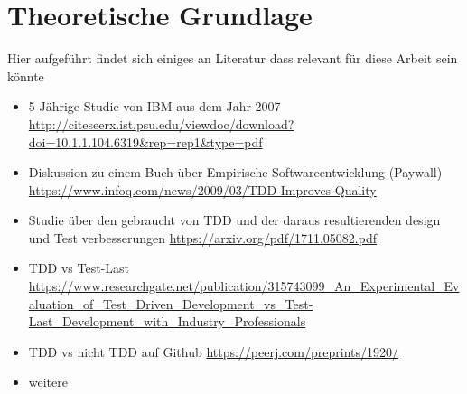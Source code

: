 \section{Theoretische Grundlage}
Hier aufgeführt findet sich einiges an Literatur dass relevant für diese Arbeit
sein könnte

\begin{itemize}
    \item 5 Jährige Studie von IBM aus dem Jahr 2007
    \url{http://citeseerx.ist.psu.edu/viewdoc/download?doi=10.1.1.104.6319&rep=rep1&type=pdf}
    \item Diskussion zu einem Buch über Empirische Softwareentwicklung (Paywall)
    \url{https://www.infoq.com/news/2009/03/TDD-Improves-Quality}
    \item Studie über den gebraucht von TDD und der daraus resultierenden design
    und Test verbesserungen
    \url{https://arxiv.org/pdf/1711.05082.pdf}
    \item TDD vs Test-Last
    \url{https://www.researchgate.net/publication/315743099_An_Experimental_Evaluation_of_Test_Driven_Development_vs_Test-Last_Development_with_Industry_Professionals}
    \item TDD vs nicht TDD auf Github
    \url{https://peerj.com/preprints/1920/}
    \item weitere
\end{itemize}
